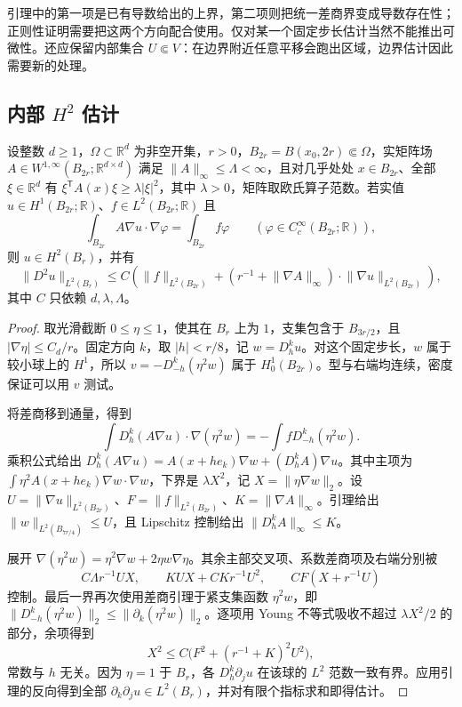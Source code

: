 引理中的第一项是已有导数给出的上界，第二项则把统一差商界变成导数存在性；正则性证明需要把这两个方向配合使用。仅对某一个固定步长估计当然不能推出可微性。还应保留内部集合 \(U\Subset V\)：在边界附近任意平移会跑出区域，边界估计因此需要新的处理。

\subsection{内部 \texorpdfstring{\(H^2\)}{H2} 估计}
\label{b2:subsec:160102}

\begin{theorem}[内部二阶估计]
\label{b2:thm:16-interior-h2}
设整数 \(d\geq1\)，\(\Omega\subset\mathbb R^d\) 为非空开集，\(r>0\)，\(B_{2r}=B(x_0,2r)\Subset\Omega\)，实矩阵场 \(A\in W^{1,\infty}(B_{2r};\mathbb R^{d\times d})\) 满足 \(\lVert A\rVert_\infty\le\Lambda<\infty\)，且对几乎处处 \(x\in B_{2r}\)、全部 \(\xi\in\mathbb R^d\) 有 \(\xi^{\mathsf T}A(x)\xi\ge\lambda|\xi|^2\)，其中 \(\lambda>0\)，矩阵取欧氏算子范数。若实值 \(u\in H^1(B_{2r};\mathbb R)\)、\(f\in L^2(B_{2r};\mathbb R)\) 且
\[\int_{B_{2r}}A\nabla u\cdot\nabla\varphi=\int_{B_{2r}}f\varphi
 \qquad(\varphi\in C_c^\infty(B_{2r};\mathbb R)),\]
则 \(u\in H^2(B_r)\)，并有
\[\lVert D^2u\rVert_{L^2(B_r)}
 \le C\left(\lVert f\rVert_{L^2(B_{2r})}
 +(r^{-1}+\lVert\nabla A\rVert_\infty)\cdot\lVert\nabla u\rVert_{L^2(B_{2r})}\right),\]
其中 \(C\) 只依赖 \(d,\lambda,\Lambda\)。
\end{theorem}
\begin{proof}
取光滑截断 \(0\le\eta\le1\)，使其在 \(B_r\) 上为 \(1\)，支集包含于 \(B_{3r/2}\)，且 \(|\nabla\eta|\le C_d/r\)。固定方向 \(k\)，取 \(|h|<r/8\)，记 \(w=D_h^ku\)。对这个固定步长，\(w\) 属于较小球上的 \(H^1\)，所以 \(v=-D_{-h}^k(\eta^2w)\) 属于 \(H_0^1(B_{2r})\)。型与右端均连续，密度保证可以用 \(v\) 测试。

将差商移到通量，得到
\[
 \int D_h^k(A\nabla u)\cdot\nabla(\eta^2w)
 =-\int fD_{-h}^k(\eta^2w).
\]
乘积公式给出 \(D_h^k(A\nabla u)=A(x+he_k)\nabla w+(D_h^kA)\nabla u\)。其中主项为 \(\int\eta^2A(x+he_k)\nabla w\cdot\nabla w\)，下界是 \(\lambda X^2\)，记 \(X=\lVert\eta\nabla w\rVert_2\)。设 \(U=\lVert\nabla u\rVert_{L^2(B_{2r})}\)、\(F=\lVert f\rVert_{L^2(B_{2r})}\)、\(K=\lVert\nabla A\rVert_\infty\)。引理给出 \(\lVert w\rVert_{L^2(B_{7r/4})}\le U\)，且 Lipschitz 控制给出 \(\lVert D_h^kA\rVert_\infty\le K\)。

展开 \(\nabla(\eta^2w)=\eta^2\nabla w+2\eta w\nabla\eta\)。其余主部交叉项、系数差商项及右端分别被
\[C\Lambda r^{-1}UX,\qquad KUX+CKr^{-1}U^2,
 \qquad CF(X+r^{-1}U)\]
控制。最后一界再次使用差商引理于紧支集函数 \(\eta^2w\)，即 \(\lVert D_{-h}^k(\eta^2w)\rVert_2\le\lVert\partial_k(\eta^2w)\rVert_2\)。逐项用 Young 不等式吸收不超过 \(\lambda X^2/2\) 的部分，余项得到
\[X^2\le C\bigl(F^2+(r^{-1}+K)^2U^2\bigr),\]
常数与 \(h\) 无关。因为 \(\eta=1\) 于 \(B_r\)，各 \(D_h^k\partial_j u\) 在该球的 \(L^2\) 范数一致有界。应用引理的反向得到全部 \(\partial_k\partial_j u\in L^2(B_r)\)，并对有限个指标求和即得估计。
\end{proof}

